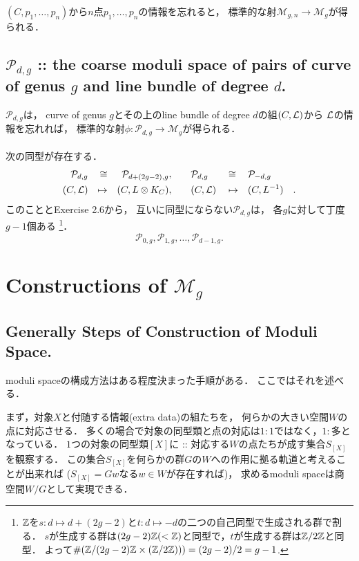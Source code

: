 \documentclass[a4paper]{jsarticle}
\newcommand{\tp}[2]{\texorpdfstring{#1}{#2}}
\newcommand{\modM}{\mathcal{M}}
\newcommand{\modP}{\mathcal{P}}
\begin{document}
    $(C, p_1,\dots,p_n)$から$n$点$p_1,\dots,p_n$の情報を忘れると，
    標準的な射$\modM_{g,n} \to \modM_g$が得られる．

    \subsection{\tp{$\modP_{d,g}$}{Pdg}
        :: the coarse moduli space of pairs of curve of genus \tp{$g$}{g} and line bundle of degree \tp{$d$}{d}. }
    $\modP_{d,g}$は，
    curve of genus $g$とその上のline bundle of degree $d$の組$(C, \mathcal{L})$から
    $\mathcal{L}$の情報を忘れれば，
    標準的な射$\phi: \modP_{d,g} \to \modM_g$が得られる．

    \paragraph{}
    次の同型が存在する．
    \[
    \begin{aligned}
        \modP_{d,g}& &\iso& &\modP_{d+(2g-2), g},&
        && \quad
        \modP_{d,g}& &\iso& &\modP_{-d, g}& \\
        (C, \shL)& &\mapsto& &(C, L \otimes K_C),&
        && \quad
        (C, \shL)& &\mapsto& &(C, L^{-1})&.
    \end{aligned}
    \]
    このこととExercise 2.6から，
    互いに同型にならない$\modP_{d,g}$は，
    各$g$に対して丁度$g-1$個ある
    \footnote
    {
        $\mathbb{Z}$を$s: d \mapsto d+(2g-2)$と$t: d \mapsto -d$の二つの自己同型で生成される群で割る．
        $s$が生成する群は$(2g-2)\mathbb{Z} (< \mathbb{Z})$と同型で，$t$が生成する群は$\mathbb{Z}/2\mathbb{Z}$と同型．
        よって$\#( \mathbb{Z}/(2g-2)\mathbb{Z} \times (\mathbb{Z}/2\mathbb{Z})) )=(2g-2)/2=g-1$.
    }．
    \[ \modP_{0,g}, \modP_{1,g}, \dots, \modP_{d-1,g}. \]
    
\section{Constructions of \tp{$\modM_g$}{Mg}}

    \subsection{Generally Steps of Construction of Moduli Space.}
    moduli spaceの構成方法はある程度決まった手順がある．
    ここではそれを述べる．

    まず，対象$X$と付随する情報(extra data)の組たちを，
    何らかの大きい空間$W$の点に対応させる．
    多くの場合で対象の同型類と点の対応は$1:1$ではなく，$1:$多となっている．
    $1$つの対象の同型類$[X]$に :: 対応する$W$の点たちが成す集合$S_{[X]}$を観察する．
    この集合$S_{[X]}$を何らかの群$G$の$W$への作用に拠る軌道と考えることが出来れば
    ($S_{[X]}=Gw$なる$w \in W$が存在すれば)，
    求めるmoduli spaceは商空間$W/G$として実現できる．
\end{document}
